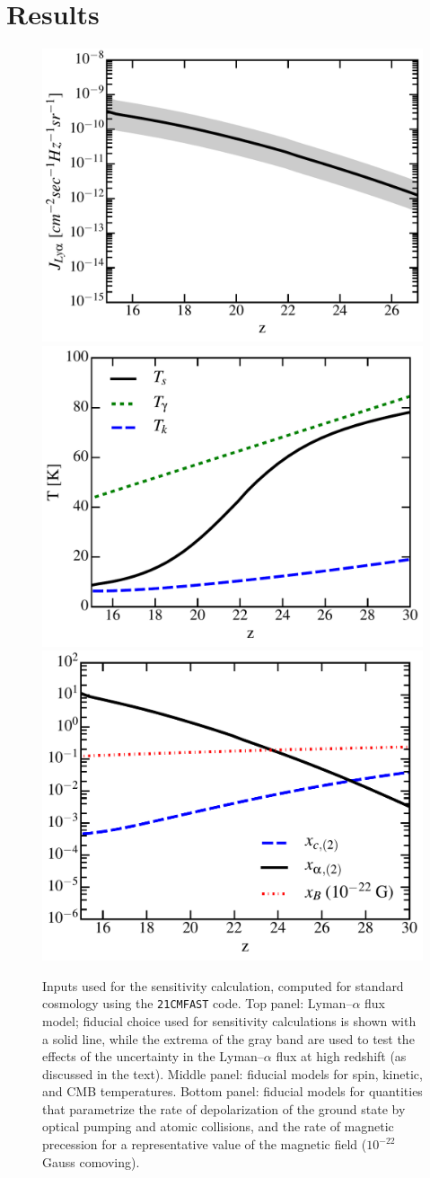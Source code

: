 \section{Results}
\label{sec:results}
\begin{figure}
\centering
\includegraphics[width=.4\textwidth,keepaspectratio=true]{Jlya.pdf}
\includegraphics[width=.4\textwidth,keepaspectratio=true]{Ts.pdf}
\includegraphics[width=.4\textwidth,keepaspectratio=true]{xs.pdf}
\caption{Inputs used for the sensitivity calculation, computed for standard cosmology using the \texttt{21CMFAST} code. Top panel: Lyman--$\alpha$ flux model; fiducial choice used for sensitivity calculations is shown with a solid line, while the extrema of the gray band are used to test the effects of the uncertainty in the Lyman--$\alpha$ flux at high redshift (as discussed in the text). Middle panel: fiducial models for spin, kinetic, and CMB temperatures. Bottom panel: fiducial models for quantities that parametrize the rate of depolarization of the ground state by optical pumping and atomic collisions, and the rate of magnetic precession for a representative value of the magnetic field ($10^{-22}$ Gauss comoving). \label{fig:cosmo}}
\end{figure}
